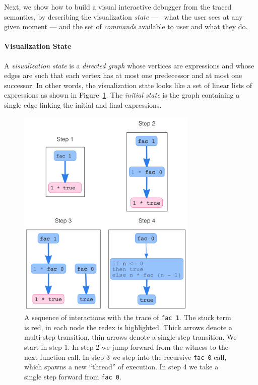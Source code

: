 Next, we show how to build a visual interactive debugger
from the traced semantics, by describing the visualization
\emph{state} --- \ie\ what the user sees at any given moment ---
and the set of \emph{commands} available to user and what
they do.

\paragraph{Visualization State}
%
A \emph{visualization state} %
is a \emph{directed graph}
whose vertices are expressions and whose edges are such
that each vertex has at most one predecessor and at most one
successor. In other words, the visualization state looks
like a set of linear lists of expressions as shown in
Figure~\ref{fig:nanomaly-factorial}.
%
The \emph{initial state} is the graph containing a single
edge linking the initial and final expressions.

\begin{figure}[t]
\centering
\includegraphics[height=4in]{fac-steps-new.png}
\caption{A sequence of interactions with the trace of
  \texttt{fac 1}. The stuck term is red, in each node the redex is
  highlighted. Thick arrows denote a multi-step transition, thin arrows
  denote a single-step transition. We start in step 1. In step 2 we jump
  forward from the witness to the next function call. In step 3 we step
  into the recursive \texttt{fac 0} call, which spawns a new ``thread''
  of execution. In step 4 we take a single step forward from
  \texttt{fac 0}.}
\label{fig:nanomaly-factorial}
\end{figure}

